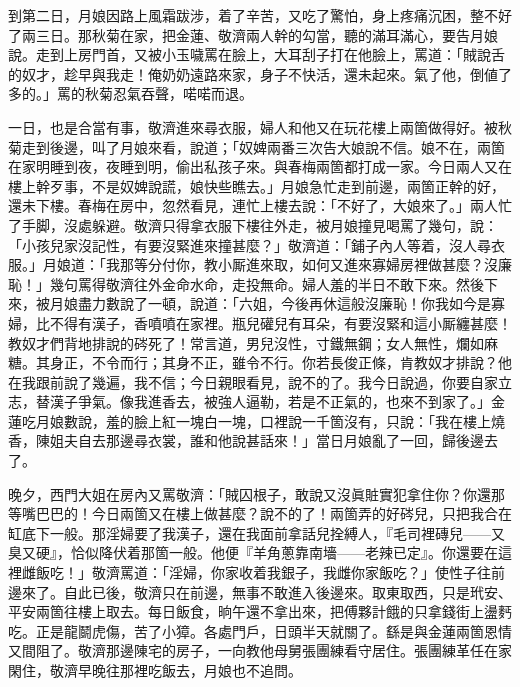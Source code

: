 到第二日，月娘因路上風霜跋涉，着了辛苦，又吃了驚怕，身上疼痛沉困，整不好了兩三日。那秋菊在家，把金蓮、敬濟兩人幹的勾當，聽的滿耳滿心，要告月娘說。走到上房門首，又被小玉噦罵在臉上，大耳刮子打在他臉上，罵道：「賊說舌的奴才，趁早與我走！俺奶奶遠路來家，身子不快活，還未起來。氣了他，倒値了多的。」罵的秋菊忍氣吞聲，喏喏而退。

一日，也是合當有事，敬濟進來尋衣服，婦人和他又在玩花樓上兩箇做得好。被秋菊走到後邊，叫了月娘來看，說道；「奴婢兩番三次告大娘說不信。娘不在，兩箇在家明睡到夜，夜睡到明，偷出私孩子來。與春梅兩箇都打成一家。今日兩人又在樓上幹歹事，不是奴婢說謊，娘快些瞧去。」月娘急忙走到前邊，兩箇正幹的好，還未下樓。春梅在房中，忽然看見，連忙上樓去說：「不好了，大娘來了。」兩人忙了手脚，沒處躲避。敬濟只得拿衣服下樓往外走，被月娘撞見喝罵了幾句，說：「小孩兒家沒記性，有要沒緊進來撞甚麼？」敬濟道：「鋪子內人等着，沒人尋衣服。」月娘道：「我那等分付你，教小厮進來取，如何又進來寡婦房裡做甚麼？沒廉恥！」幾句罵得敬濟往外金命水命，走投無命。婦人羞的半日不敢下來。{}然後下來，被月娘盡力數說了一頓，說道：「六姐，今後再休這般沒廉恥！你我如今是寡婦，比不得有漢子，香噴噴在家裡。瓶兒礶兒有耳朵，有要沒緊和這小厮纏甚麼！教奴才們背地排說的硶死了！常言道，男兒沒性，寸鐵無鋼；女人無性，爛如麻糖。其身正，不令而行；其身不正，雖令不行。你若長俊正條，肯教奴才排說？他在我跟前說了幾遍，我不信；今日親眼看見，說不的了。我今日說過，你要自家立志，替漢子爭氣。像我進香去，被強人逼勒，若是不正氣的，也來不到家了。」{}金蓮吃月娘數說，羞的臉上紅一塊白一塊，口裡說一千箇沒有，只說：「我在樓上燒香，陳姐夫自去那邊尋衣裳，誰和他說甚話來！」{}當日月娘亂了一回，歸後邊去了。

晚夕，西門大姐在房內又罵敬濟：「賊囚根子，敢說又沒眞賍實犯拿住你？你還那等嘴巴巴的！今日兩箇又在樓上做甚麼？說不的了！兩箇弄的好硶兒，只把我合在缸底下一般。那淫婦要了我漢子，還在我面前拿話兒拴縛人，『毛司裡磚兒——又臭又硬』，{}恰似降伏着那箇一般。他便『羊角蔥靠南墻——老辣已定』。你還要在這裡雌飯吃！」敬濟罵道：「淫婦，你家收着我銀子，我雌你家飯吃？」使性子往前邊來了。{}自此已後，敬濟只在前邊，無事不敢進入後邊來。取東取西，只是玳安、平安兩箇往樓上取去。每日飯食，晌午還不拿出來，把傅夥計餓的只拿錢街上盪麫吃。{}正是龍鬬虎傷，苦了小獐。各處門戶，日頭半天就關了。{}繇是與金蓮兩箇恩情又間阻了。{}敬濟那邊陳宅的房子，一向教他母舅張團練看守居住。張團練革任在家閑住，敬濟早晚往那裡吃飯去，月娘也不追問。

